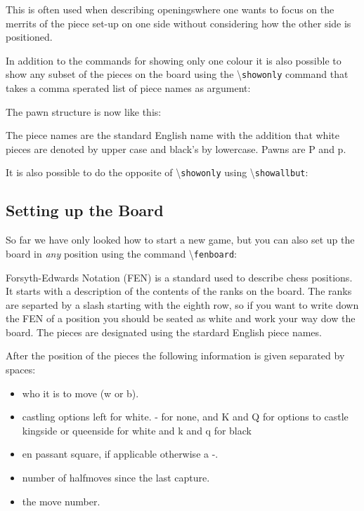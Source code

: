 \documentclass[10pt]{article}
\makeatletter
\renewcommand\showboard{\print@board}
\let\ORIshowboard\showboard
\renewcommand\showboard{%
    \makebox[8\squarelength]{%
    \rule{0pt}{9\squarelength}%
    \begin{postscript}%
    [trim = \squarelength{} 0pt \squarelength{} 0pt]
    \ORIshowboard
    \end{postscript}}}
\newcommand{\command}[1]{\textbackslash\texttt{#1}}
\makeatother
\begin{document}
This is often used when describing openingswhere one wants to focus on
the merrits of the piece set-up on one side without considering how
the other side is positioned.

In addition to the commands for showing only one colour it is also
possible to show any subset of the pieces on the board using the
\command{showonly} command that takes a comma sperated list of piece
names as argument:

\begin{LTXexample}
The pawn structure is
now like this:

\showboard
\end{LTXexample}

The piece names are the standard English name with the addition that
white pieces are denoted by upper case and black's by lowercase. Pawns
are P and p.

It is also possible to do the opposite of \command{showonly} using
\command{showallbut}:

\begin{LTXexample}
\showboard
\end{LTXexample}


\subsection{Setting up the Board}
\label{sec:setting-up-board}

So far we have only looked how to start a new game, but you can also
set up the board in \emph{any} position using the command
\command{fenboard}:

Forsyth-Edwards Notation (FEN) is a standard used to describe chess
positions. It starts with a description of the contents of the ranks
on the board. The ranks are separted by a slash starting with the
eighth row, so if you want to write down the FEN of a
position you should be seated as white and work your way dow the
board. The pieces are designated using the stardard English piece
names.

After the position of the pieces the following information is given
separated by spaces:
\begin{itemize}
\item who it is to move (w or b).
\item castling options left for white. - for none, and K and Q for
  options to castle kingside or queenside for white and k and q for black
\item en passant square, if applicable otherwise a -.
\item number of halfmoves since the last capture.
\item the move number.
\end{itemize}
\end{document}
